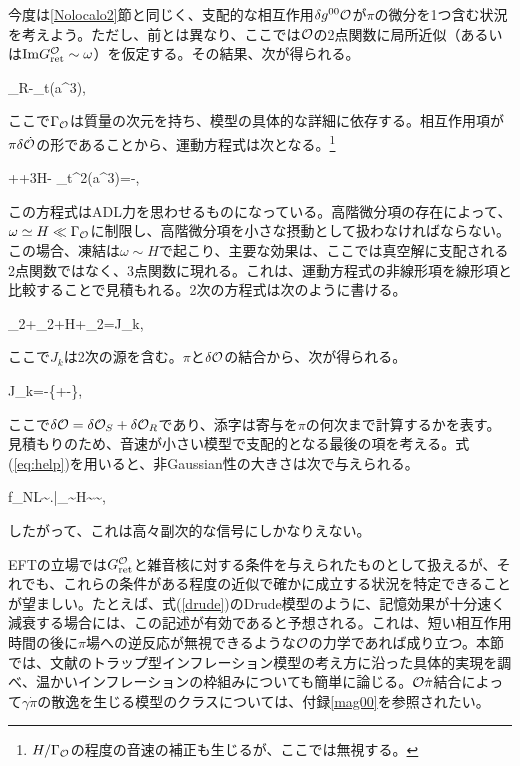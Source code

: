 今度は\ref{Nolocalo2}節と同じく、支配的な相互作用$\delta g^{00}{\cal O}$が$\pi$の微分を1つ含む状況を考えよう。ただし、前とは異なり、ここでは${\cal O}$の2点関数に局所近似（あるいは${\rm Im}G_{\rm ret}^{{\cal O}}\sim\omega$）を仮定する。その結果、次が得られる。

\beq\label{eq:help}\delta\calo_R\simeq-\partial_t(a^3\dot{\pi}),\ee

ここで$\Gamma_{\cal O}$は質量の次元を持ち、模型の具体的な詳細に依存する。相互作用項が$\pi\delta\dot{{\cal O}}$の形であることから、運動方程式は次となる。\footnote{$H/\Gamma_{\cal O}$の程度の音速の補正も生じるが、ここでは無視する。}

\beq \ddot{\pi}+\pi+3H\dot\pi- \partial_t^2(a^3\dot\pi)=-,\eeq

この方程式はADL力を思わせるものになっている。高階微分項の存在によって、$\omega\simeq H\ll\Gamma_{\cal O}$に制限し、高階微分項を小さな摂動として扱わなければならない。この場合、凍結は$\omega\sim H$で起こり、主要な効果は、ここでは真空解に支配される2点関数ではなく、3点関数に現れる。これは、運動方程式の非線形項を線形項と比較することで見積もれる。2次の方程式は次のように書ける。

\be\ddot{\pi}_2+\pi_2+H+\rp\dot{\pi}_2=J_k,\ee

ここで$J_k$は2次の源を含む。$\pi$と$\delta{\cal O}$の結合から、次が得られる。

\be \label{source}J_k=-\left\{+-\right\},\ee

ここで$\delta{\cal O}=\delta{\cal O}_S+\delta{\cal O}_R$であり、添字は寄与を$\pi$の何次まで計算するかを表す。見積もりのため、音速が小さい模型で支配的となる最後の項を考える。式(\ref{eq:help})を用いると、非Gaussian性の大きさは次で与えられる。

\be
f_{\rm NL}\zeta\sim\left.\right|_{\omega\sim H}\sim{}\cdot {}\sim{}\cdot{}\zeta\ll {}\zeta,
\ee

したがって、これは高々副次的な信号にしかなりえない。

\label{matching}

EFTの立場では$G_{\rm ret}^{{\cal O}}$と雑音核に対する条件を与えられたものとして扱えるが、それでも、これらの条件がある程度の近似で確かに成立する状況を特定できることが望ましい。たとえば、式(\ref{drude})のDrude模型のように、記憶効果が十分速く減衰する場合には、この記述が有効であると予想される。これは、短い相互作用時間の後に$\pi$場への逆反応が無視できるような${\cal O}$の力学であれば成り立つ。本節では、文献\cite{trapped}のトラップ型インフレーション模型の考え方に沿った具体的実現を調べ、温かいインフレーションの枠組み\cite{berera1,berera2,warm}についても簡単に論じる。${\cal O}\dot\pi$結合によって$\gamma\dot\pi$の散逸を生じる模型のクラスについては、付録\ref{mag00}を参照されたい。

